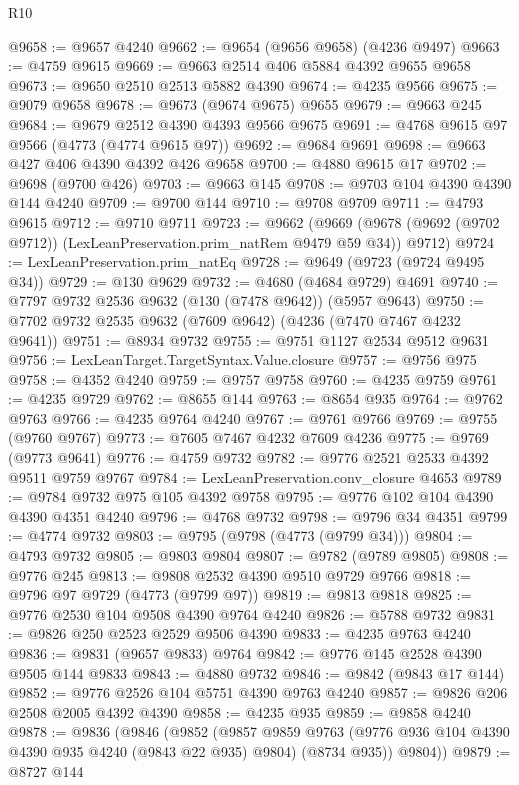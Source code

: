 \begin{lexlean}{R10}
\begin{coremodule}
@9658 := @9657 @4240
@9662 := @9654 (@9656 @9658) (@4236 @9497)
@9663 := @4759 @9615
@9669 := @9663 @2514 @406 @5884 @4392 @9655 @9658
@9673 := @9650 @2510 @2513 @5882 @4390
@9674 := @4235 @9566
@9675 := @9079 @9658
@9678 := @9673 (@9674 @9675) @9655
@9679 := @9663 @245
@9684 := @9679 @2512 @4390 @4393 @9566 @9675
@9691 := @4768 @9615 @97 @9566 (@4773 (@4774 @9615 @97))
@9692 := @9684 @9691
@9698 := @9663 @427 @406 @4390 @4392 @426 @9658
@9700 := @4880 @9615 @17
@9702 := @9698 (@9700 @426)
@9703 := @9663 @145
@9708 := @9703 @104 @4390 @4390 @144 @4240
@9709 := @9700 @144
@9710 := @9708 @9709
@9711 := @4793 @9615
@9712 := @9710 @9711
@9723 := @9662
    (@9669 (@9678 (@9692 (@9702 @9712)) (LexLeanPreservation.prim_natRem @9479 @59 @34)) @9712)
@9724 := LexLeanPreservation.prim_natEq
@9728 := @9649 (@9723 (@9724 @9495 @34))
@9729 := @130 @9629
@9732 := @4680 (@4684 @9729) @4691
@9740 := @7797 @9732 @2536 @9632 (@130 (@7478 @9642)) (@5957 @9643)
@9750 := @7702 @9732 @2535 @9632 (@7609 @9642) (@4236 (@7470 @7467 @4232 @9641))
@9751 := @8934 @9732
@9755 := @9751 @1127 @2534 @9512 @9631
@9756 := LexLeanTarget.TargetSyntax.Value.closure
@9757 := @9756 @975
@9758 := @4352 @4240
@9759 := @9757 @9758
@9760 := @4235 @9759
@9761 := @4235 @9729
@9762 := @8655 @144
@9763 := @8654 @935
@9764 := @9762 @9763
@9766 := @4235 @9764 @4240
@9767 := @9761 @9766
@9769 := @9755 (@9760 @9767)
@9773 := @7605 @7467 @4232 @7609 @4236
@9775 := @9769 (@9773 @9641)
@9776 := @4759 @9732
@9782 := @9776 @2521 @2533 @4392 @9511 @9759 @9767
@9784 := LexLeanPreservation.conv_closure @4653
@9789 := @9784 @9732 @975 @105 @4392 @9758
@9795 := @9776 @102 @104 @4390 @4390 @4351 @4240
@9796 := @4768 @9732
@9798 := @9796 @34 @4351
@9799 := @4774 @9732
@9803 := @9795 (@9798 (@4773 (@9799 @34)))
@9804 := @4793 @9732
@9805 := @9803 @9804
@9807 := @9782 (@9789 @9805)
@9808 := @9776 @245
@9813 := @9808 @2532 @4390 @9510 @9729 @9766
@9818 := @9796 @97 @9729 (@4773 (@9799 @97))
@9819 := @9813 @9818
@9825 := @9776 @2530 @104 @9508 @4390 @9764 @4240
@9826 := @5788 @9732
@9831 := @9826 @250 @2523 @2529 @9506 @4390
@9833 := @4235 @9763 @4240
@9836 := @9831 (@9657 @9833) @9764
@9842 := @9776 @145 @2528 @4390 @9505 @144 @9833
@9843 := @4880 @9732
@9846 := @9842 (@9843 @17 @144)
@9852 := @9776 @2526 @104 @5751 @4390 @9763 @4240
@9857 := @9826 @206 @2508 @2005 @4392 @4390
@9858 := @4235 @935
@9859 := @9858 @4240
@9878 := @9836
    (@9846
      (@9852
        (@9857
          @9859
          @9763
          (@9776 @936 @104 @4390 @4390 @935 @4240 (@9843 @22 @935) @9804)
          (@8734 @935))
        @9804))
@9879 := @8727 @144

\end{coremodule}
\end{lexlean}
